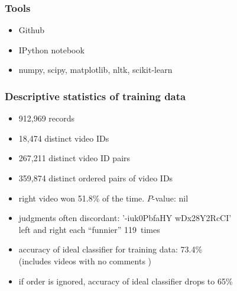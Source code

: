 \documentclass[fleqn]{beamer}
\begin{document}
\begin{frame}
\frametitle{Tools}
   \begin{itemize}
        \item Github
        \item IPython notebook
        \item numpy, scipy, matplotlib, nltk, scikit-learn
   \end{itemize}

\end{frame}

 \begin{frame}
\frametitle{Descriptive statistics of training data}
      \begin{itemize}
         \item 912,969 records
         \item 18,474 distinct video IDs
         \item 267,211 distinct video ID pairs
         \item 359,874 distinct ordered pairs of video IDs
         \item right video won 51.8\% of the time. $P$-value: nil
         \item judgments often discordant: 
                  '-iuk0PbfaHY wDx28Y2RcCI' \\
                  left and right each ``funnier'' 119~times
         \item accuracy of ideal classifier for training data: 73.4\% \\
                  (includes videos with no comments )
         \item if order is ignored,  accuracy of ideal classifier drops to 65\%
     \end{itemize}

\end{frame}
\end{document}
